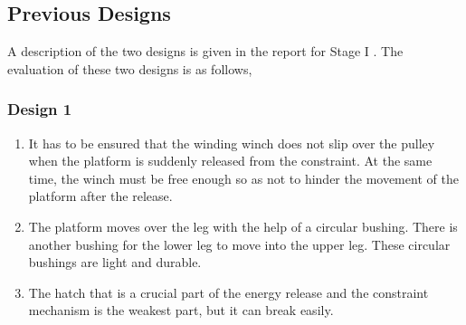 \subsection*{Previous Designs}
\label{sec_3:mechanical}

A description of the two designs is given in the report for Stage I \cite{stage1}. The evaluation 
of these two designs is as follows,
\subsubsection*{Design 1}
\begin{enumerate}
  \item
  It has to be ensured that the winding winch does not slip over the pulley when the platform is suddenly released from the constraint. At the same time, the winch must be free enough so as not to hinder the 	movement of the platform after the release.
  \item
  The platform moves over the leg with the help of a circular bushing. There is another bushing for the lower leg to move into the upper leg. These circular bushings are light and durable.
  \item
  The hatch that is a crucial part of the energy release and the constraint mechanism is the weakest part, but it can break easily.
\end{enumerate}

